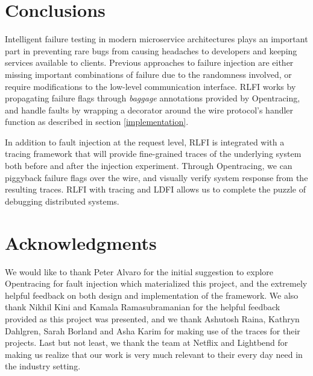 \documentclass[letterpaper,twocolumn,10pt]{article}
\begin{document}
\section{Conclusions}
Intelligent failure testing in modern microservice architectures plays an important part in preventing rare bugs from causing headaches to developers and keeping services available to clients. Previous approaches to failure injection are either missing important combinations of failure due to the randomness involved, or require modifications to the low-level communication interface. RLFI works by propagating failure flags through \textit{baggage} annotations provided by Opentracing\cite{opentracing:doc}, and handle faults by wrapping a decorator around the wire protocol's handler function as described in section \ref{implementation}. 

In addition to fault injection at the request level, RLFI is integrated with a tracing framework that will provide fine-grained traces of the underlying system both before and after the injection experiment. Through Opentracing, we can piggyback failure flags over the wire, and visually verify system response from the resulting traces. RLFI with tracing and LDFI\cite{alvaro:ldfi} allows us to complete the puzzle of debugging distributed systems.


\section{Acknowledgments}
We would like to thank Peter Alvaro for the initial suggestion to explore Opentracing for fault injection which materialized this project, and the extremely helpful feedback on both design and implementation of the framework. We also thank Nikhil Kini and Kamala Ramasubramanian for the helpful feedback provided as this project was presented, and we thank Ashutosh Raina, Kathryn Dahlgren, Sarah Borland and Asha Karim for making use of the traces for their projects. Last but not least, we thank the team at Netflix and Lightbend for making us realize that our work is very much relevant to their every day need in the industry setting.



\end{document}
